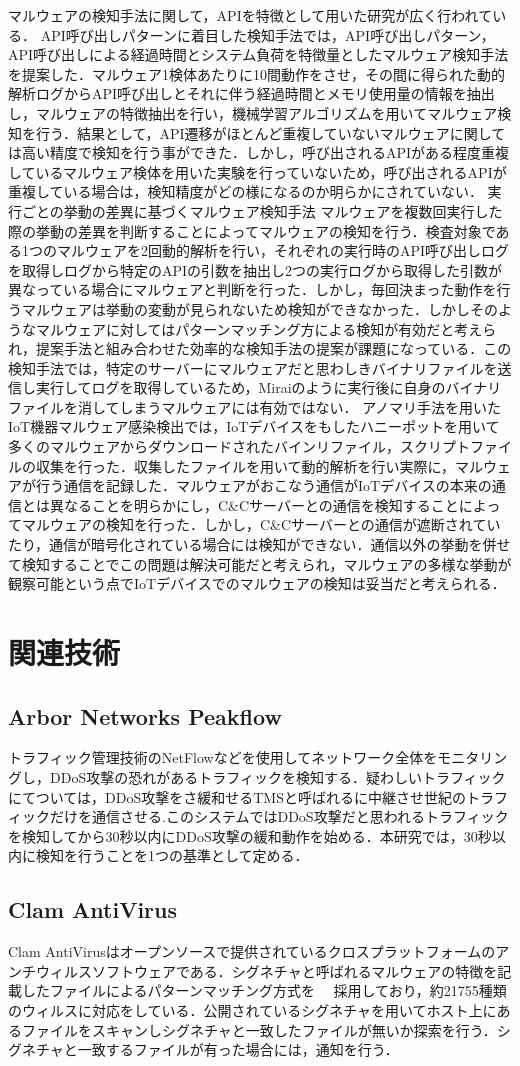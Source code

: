 マルウェアの検知手法に関して，APIを特徴として用いた研究が広く行われている．
API呼び出しパターンに着目した検知手法では，API呼び出しパターン，API呼び出しによる経過時間とシステム負荷を特徴量としたマルウェア検知手法を提案した．マルウェア1検体あたりに10間動作をさせ，その間に得られた動的解析ログからAPI呼び出しとそれに伴う経過時間とメモリ使用量の情報を抽出し，マルウェアの特徴抽出を行い，機械学習アルゴリズムを用いてマルウェア検知を行う．結果として，API遷移がほとんど重複していないマルウェアに関しては高い精度で検知を行う事ができた．しかし，呼び出されるAPIがある程度重複しているマルウェア検体を用いた実験を行っていないため，呼び出されるAPIが重複している場合は，検知精度がどの様になるのか明らかにされていない．
実行ごとの挙動の差異に基づくマルウェア検知手法
マルウェアを複数回実行した際の挙動の差異を判断することによってマルウェアの検知を行う．検査対象である1つのマルウェアを2回動的解析を行い，それぞれの実行時のAPI呼び出しログを取得しログから特定のAPIの引数を抽出し2つの実行ログから取得した引数が異なっている場合にマルウェアと判断を行った．しかし，毎回決まった動作を行うマルウェアは挙動の変動が見られないため検知ができなかった．しかしそのようなマルウェアに対してはパターンマッチング方による検知が有効だと考えられ，提案手法と組み合わせた効率的な検知手法の提案が課題になっている．この検知手法では，特定のサーバーにマルウェアだと思わしきバイナリファイルを送信し実行してログを取得しているため，Miraiのように実行後に自身のバイナリファイルを消してしまうマルウェアには有効ではない．
アノマリ手法を用いたIoT機器マルウェア感染検出では，IoTデバイスをもしたハニーポットを用いて多くのマルウェアからダウンロードされたバインリファイル，スクリプトファイルの収集を行った．収集したファイルを用いて動的解析を行い実際に，マルウェアが行う通信を記録した．マルウェアがおこなう通信がIoTデバイスの本来の通信とは異なることを明らかにし，C\&Cサーバーとの通信を検知することによってマルウェアの検知を行った．しかし，C\&Cサーバーとの通信が遮断されていたり，通信が暗号化されている場合には検知ができない．通信以外の挙動を併せて検知することでこの問題は解決可能だと考えられ，マルウェアの多様な挙動が観察可能という点でIoTデバイスでのマルウェアの検知は妥当だと考えられる．

\section{関連技術}

\subsection{Arbor Networks Peakflow}
トラフィック管理技術のNetFlowなどを使用してネットワーク全体をモニタリングし，DDoS攻撃の恐れがあるトラフィックを検知する．疑わしいトラフィックにてついては，DDoS攻撃をさ緩和せるTMSと呼ばれるに中継させ世紀のトラフィックだけを通信させる.このシステムではDDoS攻撃だと思われるトラフィックを検知してから30秒以内にDDoS攻撃の緩和動作を始める．本研究では，30秒以内に検知を行うことを1つの基準として定める．
\subsection{Clam AntiVirus}
Clam AntiVirusはオープンソースで提供されているクロスプラットフォームのアンチウィルスソフトウェアである．シグネチャと呼ばれるマルウェアの特徴を記載したファイルによるパターンマッチング方式を　
採用しており，約21755種類のウィルスに対応をしている．公開されているシグネチャを用いてホスト上にあるファイルをスキャンしシグネチャと一致したファイルが無いか探索を行う．シグネチャと一致するファイルが有った場合には，通知を行う．
